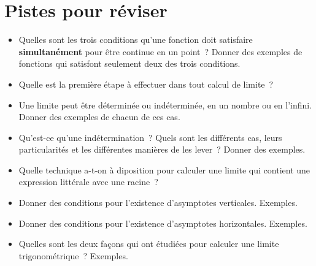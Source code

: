 \documentclass[a4paper,12pt]{article}
\begin{document}
\section{Pistes pour réviser}
\begin{itemize}
	\item Quelles sont les trois conditions qu'une fonction doit satisfaire {\bfseries simultanément} pour être continue en un point~? Donner des exemples de fonctions qui satisfont seulement deux des trois conditions.
	\item Quelle est la première étape à effectuer dans tout calcul de limite~?
	\item Une limite peut être déterminée ou indéterminée, en un nombre ou en l'infini. Donner des exemples de chacun de ces cas. 
	\item Qu'est-ce qu'une indétermination~? Quels sont les différents cas, leurs particularités et les différentes manières de les lever~? Donner des exemples.
	\item Quelle technique a-t-on à diposition pour calculer une limite qui contient une expression littérale avec une racine~?
	\item Donner des conditions pour l'existence d'asymptotes verticales. Exemples. 
	\item Donner des conditions pour l'existence d'asymptotes horizontales. Exemples.
	\item Quelles sont les deux façons qui ont étudiées pour calculer une limite trigonométrique~? Exemples. 
\end{itemize}
 \nocite{*}
 \vspace{-10pt}
 \printbibliography[prenote=myprenote,title={Sources du cours}] 
\end{document}
